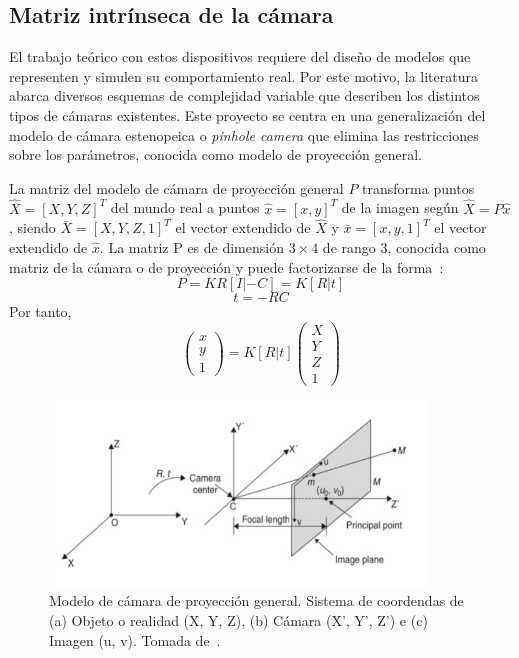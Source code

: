 \subsection{Matriz intrínseca de la cámara}

El trabajo teórico con estos dispositivos requiere del diseño de modelos que representen y simulen su comportamiento real. Por este motivo, la literatura abarca diversos esquemas de complejidad variable que describen los distintos tipos de cámaras existentes. Este proyecto se centra en una generalización del modelo de cámara estenopeica o \textit{pinhole camera} que elimina las restricciones sobre los parámetros, conocida como modelo de proyección general. 

\begin{definition}
	La matriz del modelo de cámara de proyección general $P$ transforma puntos $\hat{X} = [X, Y, Z]^T$ del mundo real a puntos $\hat{x} = [x, y]^T$ de la imagen según $\hat{X} = P\hat{x}$, siendo $\bar{X} = [X, Y, Z, 1]^T$ el vector extendido de $\hat{X}$ y $\bar{x} = [x, y, 1]^T$ el vector extendido de $\hat{x}$. La matriz P es de dimensión $3 \times 4$ de rango 3, conocida como matriz de la cámara o de proyección y puede factorizarse de la forma~\cite{hartley2004camera}:
	\begin{equation}\label{eq:proyGeneral-1}
		P = KR[I| - C] = K[R|t]
	\end{equation}
	\begin{equation}\label{eq:proyGeneral-2}
		t = -RC
	\end{equation}
	Por tanto,
	\begin{equation}\label{eq:proyGeneral-3}
		\begin{pmatrix}
			x\\
			y\\
			1
		\end{pmatrix} = K[R|t] \begin{pmatrix}
			X\\
			Y\\
			Z\\
			1	
		\end{pmatrix}
	\end{equation}
\end{definition}

\begin{figure}[ht]
	\centering
	\includegraphics[width=10cm]{./Graphics/modelo-proyeccion-general.png}
	\caption{Modelo de cámara de proyección general. Sistema de coordendas de (a) Objeto o realidad (X, Y, Z), (b) Cámara (X', Y', Z') e (c) Imagen (u, v). Tomada de~\cite{ji2022vision}.}
	\label{fig:proyGeneral}
\end{figure}

